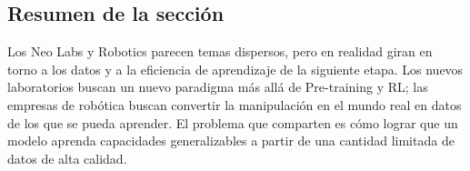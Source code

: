 \subsection{Resumen de la sección}

Los Neo Labs y Robotics parecen temas dispersos, pero en realidad giran en torno a los datos y a la eficiencia de aprendizaje de la siguiente etapa. Los nuevos laboratorios buscan un nuevo paradigma más allá de Pre-training y RL; las empresas de robótica buscan convertir la manipulación en el mundo real en datos de los que se pueda aprender. El problema que comparten es cómo lograr que un modelo aprenda capacidades generalizables a partir de una cantidad limitada de datos de alta calidad.
